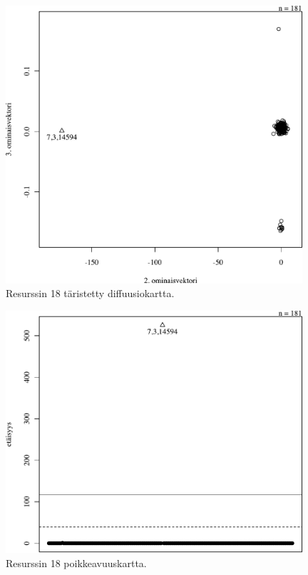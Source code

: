 \begin{figure}[p]
\centering
\includegraphics[width=11cm]{pics/diffuusiokuvat/service_18.pdf}
\caption{Resurssin 18 täristetty diffuusiokartta.}
\label{diffusio_18}
\end{figure}

\begin{figure}[p]
\centering
\includegraphics[width=11cm]{pics/tiheyskuvat/service_18.pdf}
\caption{Resurssin 18 poikkeavuuskartta.}
\label{service_18}
\end{figure}

